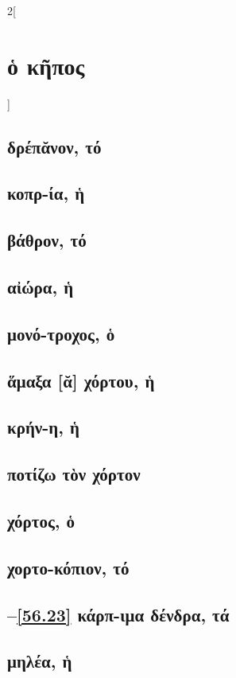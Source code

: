 \documentclass{book}
\begin{document}
\begin{multicols}{2}[\section{ὁ κῆπος}]
\subsection{δρέπᾰνον, τό}
 \label{56.10}  
\subsection{κοπρ-ία, ἡ}
\subsection{βάθρον, τό}
\subsection{αἰώρα, ἡ}
\subsection{μονό-τροχος, ὁ}
\subsection{ἅμαξα [ᾰ] χόρτου, ἡ}
\subsection{κρήν-η, ἡ}
\subsection{ποτίζω τὸν χόρτον}
\subsection{χόρτος, ὁ}
\subsection{χορτο-κόπιον, τό}
\subsection{\protect\hspace{-2ex}--\ref{56.23} κάρπ-ιμα δένδρα, τά}
 \setcounter{subsection}{19}
\subsection{μηλέα, ἡ}

\end{multicols}
\end{document}
